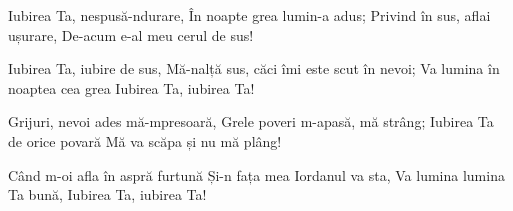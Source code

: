 \beginverse
Iubirea Ta, nespusă-ndurare,
În noapte grea lumin-a adus;
Privind în sus, aflai ușurare,
De-acum e-al meu cerul de sus!
\endverse

\beginchorus
Iubirea Ta, iubire de sus,
Mă-nalță sus, căci îmi este scut în nevoi;
Va lumina în noaptea cea grea
Iubirea Ta, iubirea Ta!
\endchorus

\beginverse
Grijuri, nevoi ades mă-mpresoară,
Grele poveri m-apasă, mă strâng;
Iubirea Ta de orice povară
Mă va scăpa și nu mă plâng!
\endverse

\beginverse
Când m-oi afla în aspră furtună
Și-n fața mea Iordanul va sta,
Va lumina lumina Ta bună,
Iubirea Ta, iubirea Ta!
\endverse
\endsong